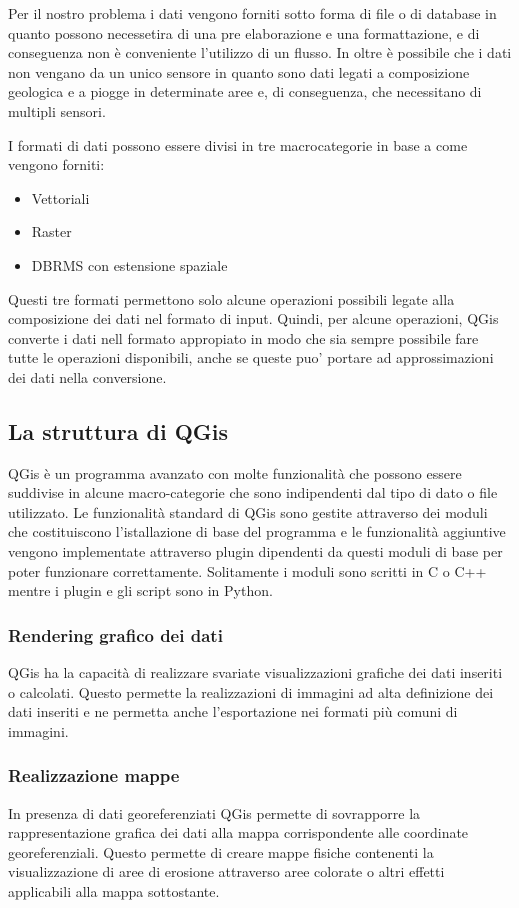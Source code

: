 Per il nostro problema i dati vengono forniti sotto forma di file o di database in quanto possono necessetira di una pre elaborazione e una formattazione, e di conseguenza non è conveniente l'utilizzo di un flusso. In oltre è possibile che i dati non vengano da un unico sensore in quanto sono dati legati a composizione geologica e a piogge in determinate aree e, di conseguenza, che necessitano di multipli sensori.


I formati di dati possono essere divisi in tre macrocategorie in base a come vengono forniti:
\begin{itemize}
	\item Vettoriali
	\item Raster
	\item DBRMS con estensione spaziale
\end{itemize}

Questi tre formati permettono solo alcune operazioni possibili legate alla composizione dei dati nel formato di input.
Quindi, per alcune operazioni, QGis converte i dati nell formato appropiato in modo che sia sempre possibile fare tutte le operazioni disponibili, anche se queste puo' portare ad approssimazioni dei dati nella conversione.

\subsection{La struttura di QGis}
QGis è un programma avanzato con molte funzionalità che possono essere suddivise in alcune macro-categorie che sono indipendenti dal tipo di dato o file utilizzato.
Le funzionalità standard di QGis sono gestite attraverso dei moduli che costituiscono l'istallazione di base del programma e le funzionalità aggiuntive vengono implementate attraverso plugin dipendenti da questi moduli di base per poter funzionare correttamente.
Solitamente i moduli sono scritti in C o C++ mentre i plugin e gli script sono in Python.

\subsubsection{Rendering grafico dei dati}
QGis ha la capacità di realizzare svariate visualizzazioni grafiche dei dati inseriti o calcolati.
Questo permette la realizzazioni di immagini ad alta definizione dei dati inseriti e ne permetta anche l'esportazione nei formati più comuni di immagini.

\subsubsection{Realizzazione mappe}
In presenza di dati georeferenziati QGis permette di sovrapporre la rappresentazione grafica dei dati alla mappa corrispondente alle coordinate georeferenziali.
Questo permette di creare mappe fisiche contenenti la visualizzazione di aree di erosione attraverso aree colorate o altri effetti applicabili alla mappa sottostante.

